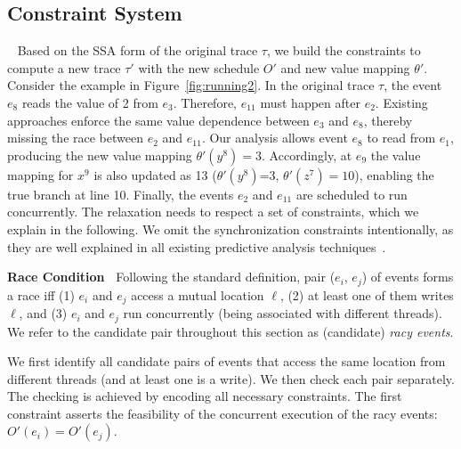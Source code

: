 




\subsection{Constraint System}~\label{sec:constraints}
Based on the SSA form of the original trace $\tau$, we build the constraints to compute a new trace $\tau'$ with the new schedule $O'$ and new value mapping $\theta'$.
Consider the example in Figure~\ref{fig:running2}. In the original trace $\tau$, the event $e_8$ reads the value of 2 from $e_3$. Therefore, $e_{11}$ must happen after $e_2$. Existing approaches enforce the same value dependence between $e_3$ and $e_8$, thereby missing the race between $e_2$ and $e_{11}$.
Our analysis allows event $e_8$ to read from $e_1$, producing the new value mapping $\theta'(y^8)=3$. Accordingly, at $e_9$ the value mapping for $x^9$ is also updated as 13 ($\theta'(y^8)$=3, $\theta'(z^7)=10$), enabling the true branch at line 10. Finally, the events $e_2$ and $e_{11}$ are scheduled to run concurrently.  The relaxation needs to respect a set of constraints, which we explain in the following. We omit the synchronization constraints intentionally, as they are well explained in all existing predictive analysis techniques~\cite{yannis, pldi14}.



{\bf Race Condition\ } Following the standard definition, pair ($e_i$, $e_j$) of events forms a race iff (1) $e_i$ and $e_j$ access a mutual  location $\ell$, (2) at least one of them writes $\ell$, and (3) $e_i$ and $e_j$ run concurrently (being associated with different threads). We refer to the candidate pair throughout this section as (candidate) \emph{racy events}.  

We first identify all candidate pairs of events that access the same location from different threads (and at least one is a write). We then check each pair  separately.   The checking is achieved by encoding all necessary constraints.  The first constraint asserts the feasibility of the concurrent execution of the racy events: $O'(e_i) = O'(e_{j})$.

